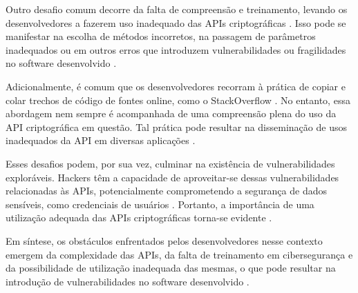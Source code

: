 Outro desafio comum decorre da falta de compreensão e treinamento, levando os desenvolvedores a fazerem uso inadequado das APIs criptográficas \cite{api_misuses_zhang}. Isso pode se manifestar na escolha de métodos incorretos, na passagem de parâmetros inadequados ou em outros erros que introduzem vulnerabilidades ou fragilidades no software desenvolvido \cite{api_misuses_zhang}.

Adicionalmente, é comum que os desenvolvedores recorram à prática de copiar e colar trechos de código de fontes online, como o StackOverflow \cite{api_misuses_zhang}. No entanto, essa abordagem nem sempre é acompanhada de uma compreensão plena do uso da API criptográfica em questão. Tal prática pode resultar na disseminação de usos inadequados da API em diversas aplicações \cite{api_misuses_zhang}.

Esses desafios podem, por sua vez, culminar na existência de vulnerabilidades exploráveis. Hackers têm a capacidade de aproveitar-se dessas vulnerabilidades relacionadas às APIs, potencialmente comprometendo a segurança de dados sensíveis, como credenciais de usuários \cite{api_misuses_zhang}. Portanto, a importância de uma utilização adequada das APIs criptográficas torna-se evidente \cite{api_misuses_zhang}.

Em síntese, os obstáculos enfrentados pelos desenvolvedores nesse contexto emergem da complexidade das APIs, da falta de treinamento em cibersegurança e da possibilidade de utilização inadequada das mesmas, o que pode resultar na introdução de vulnerabilidades no software desenvolvido \cite{api_misuses_zhang}.


